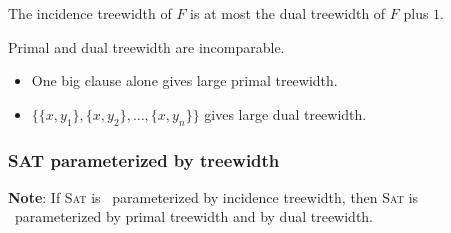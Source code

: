 \begin{frame}
  \begin{lemma}
    The incidence treewidth of $F$ is at most the dual treewidth of $F$ plus $1$.
  \end{lemma}
  \pause
  \noindent
  Primal and dual treewidth are incomparable. 
    \begin{itemize}
    \item One big clause alone gives
    large primal treewidth.
  \item  $\{\{x,y_1\},\{x,y_2\},\dots,\{x,y_n\}\}$
    gives large dual treewidth.
    \end{itemize}
\end{frame}


\begin{frame}
	\frametitle{\textsc{SAT} parameterized by treewidth}
	
	\noindent
	\textbf{Note}: If \textsc{Sat} is \FPT\ parameterized by incidence treewidth, then \textsc{Sat} is \FPT\ parameterized by primal treewidth and by dual treewidth.
\end{frame}


